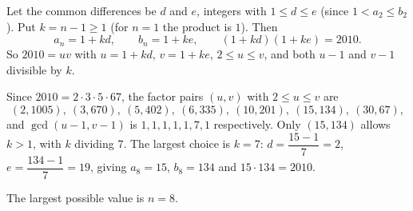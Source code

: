 Let the common differences be $d$ and $e$, integers with $1\le d\le e$ (since $1<a_2\le b_2$). Put $k=n-1\ge1$ (for $n=1$ the product is $1$). Then
\[a_n=1+kd,\qquad b_n=1+ke,\qquad(1+kd)(1+ke)=2010.\]
So $2010=uv$ with $u=1+kd$, $v=1+ke$, $2\le u\le v$, and both $u-1$ and $v-1$ divisible by $k$.

Since $2010=2\cdot3\cdot5\cdot67$, the factor pairs $(u,v)$ with $2\le u\le v$ are
\[(2,1005),\ (3,670),\ (5,402),\ (6,335),\ (10,201),\ (15,134),\ (30,67),\]
and $\gcd(u-1,v-1)$ is $1,1,1,1,1,7,1$ respectively. Only $(15,134)$ allows $k>1$, with $k$ dividing $7$. The largest choice is $k=7$: $d=\dfrac{15-1}{7}=2$, $e=\dfrac{134-1}{7}=19$, giving $a_8=15$, $b_8=134$ and $15\cdot134=2010$.

The largest possible value is $n=\boxed{8}$.
